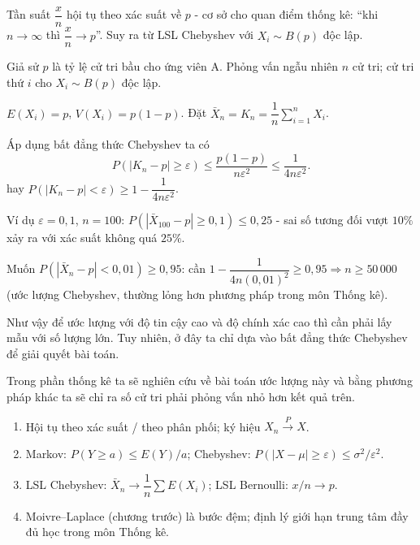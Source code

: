 \documentclass[12pt,a4paper]{article}
\begin{document}
\begin{luuy}
Tần suất $\dfrac{x}{n}$ hội tụ theo xác suất về $p$ - cơ sở cho quan điểm thống kê: ``khi $n \to \infty$ thì $\dfrac{x}{n} \to p$''. Suy ra từ LSL Chebyshev với $X_i \sim B(p)$ độc lập.
\end{luuy}

\begin{vidu}[title={Phỏng vấn cử tri}]
Giả sử $p$ là tỷ lệ cử tri bầu cho ứng viên A. Phỏng vấn ngẫu nhiên $n$ cử tri; cử tri thứ $i$ cho $X_i \sim B(p)$ độc lập.

$E(X_i) = p$, $V(X_i) = p(1-p)$. Đặt $\bar{X}_n = K_n = \dfrac{1}{n}\sum_{i=1}^n X_i$.

Áp dụng bất đẳng thức Chebyshev ta có
\[
  P(|K_n - p| \ge \varepsilon) \le \dfrac{p(1 - p)}{n\varepsilon^2} \le \dfrac{1}{4n\varepsilon^2}.
\]
hay $P(|K_n - p| < \varepsilon) \ge 1 - \dfrac{1}{4n\varepsilon^2}$.

Ví dụ $\varepsilon = 0{,}1$, $n = 100$: $P(|\bar{X}_{100} - p| \ge 0{,}1) \le 0{,}25$ - sai số tương đối vượt $10\%$ xảy ra với xác suất không quá $25\%$.

Muốn $P(|\bar{X}_n - p| < 0{,}01) \ge 0{,}95$: cần $1 - \dfrac{1}{4n(0{,}01)^2} \ge 0{,}95 \Rightarrow n \ge 50\,000$ (ước lượng Chebyshev, thường lỏng hơn phương pháp trong môn Thống kê).

Như vậy để ước lượng với độ tin cậy cao và độ chính xác cao thì cần phải lấy mẫu với số lượng lớn. Tuy nhiên, ở đây ta chỉ dựa vào bất đẳng thức Chebyshev để giải quyết bài toán.

Trong phần thống kê ta sẽ nghiên cứu về bài toán ước lượng này và bằng phương pháp khác ta sẽ chỉ ra số cử tri phải phỏng vấn nhỏ hơn kết quả trên.
\end{vidu}

\begin{tongket}[title={Tổng kết: Luật số lớn}]
\begin{enumerate}
  \item Hội tụ theo xác suất / theo phân phối; ký hiệu $X_n \xrightarrow{P} X$.
  \item Markov: $P(Y \ge a) \le E(Y)/a$; Chebyshev: $P(|X-\mu| \ge \varepsilon) \le \sigma^2/\varepsilon^2$.
  \item LSL Chebyshev: $\bar{X}_n \to \dfrac{1}{n}\sum E(X_i)$; LSL Bernoulli: $x/n \to p$.
  \item Moivre--Laplace (chương trước) là bước đệm; định lý giới hạn trung tâm đầy đủ học trong môn Thống kê.
\end{enumerate}
\end{tongket}
\end{document}
